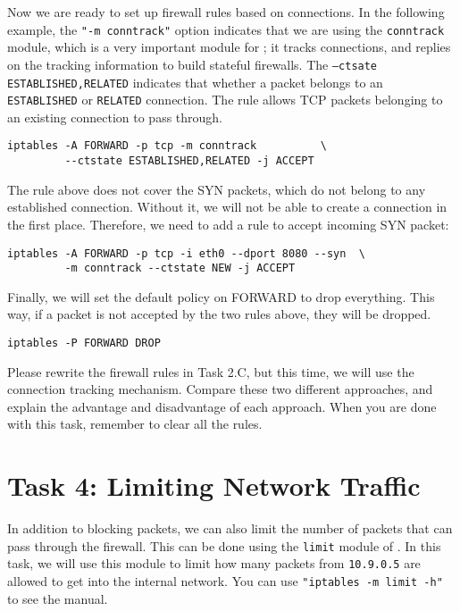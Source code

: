 Now we are ready to set up firewall rules based on connections. 
In the following example, 
the \texttt{"-m conntrack"} option indicates that we are using the \texttt{conntrack} module,
which is a very important module for \iptables; it tracks connections, and
\iptables replies on the tracking information to build stateful firewalls. 
The \texttt{--ctsate ESTABLISHED,RELATED} indicates that whether a packet
belongs to an \texttt{ESTABLISHED} or \texttt{RELATED} connection.
The rule allows TCP packets belonging to an existing connection to 
pass through. 

\begin{lstlisting}
iptables -A FORWARD -p tcp -m conntrack          \
         --ctstate ESTABLISHED,RELATED -j ACCEPT
\end{lstlisting}


The rule above does not cover the SYN packets, which do not belong to 
any established connection. Without it, we will not be able to 
create a connection in the first place. Therefore, we need to 
add a rule to accept incoming SYN packet: 

\begin{lstlisting}
iptables -A FORWARD -p tcp -i eth0 --dport 8080 --syn  \
         -m conntrack --ctstate NEW -j ACCEPT 
\end{lstlisting}

Finally, we will set the default policy on FORWARD to drop
everything. This way, if a packet is not accepted by the two
rules above, they will be dropped. 

\begin{lstlisting}
iptables -P FORWARD DROP
\end{lstlisting}


Please rewrite the firewall rules in Task 2.C, but this time,
we will use the connection tracking mechanism. 
Compare these two different approaches, and 
explain the advantage and disadvantage of each approach. 
When you are done with this task, remember to clear all the rules. 



\section{Task 4: Limiting Network Traffic}

In addition to blocking packets, we can also 
limit the number of packets that can pass through the firewall. 
This can be done using the \texttt{limit} module of \iptables.
In this task, we will use this module to limit how many packets 
from \texttt{10.9.0.5} are allowed to get into the internal network. 
You can use \texttt{"iptables -m limit -h"} to see the manual.  

